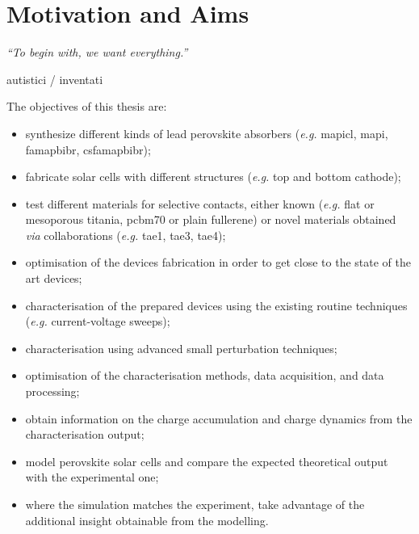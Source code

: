 %
%
%
%

\section{Motivation and Aims}\label{sec:aims}
\epigraph{\textit{\enquote{To begin with, we want everything.}}}{autistici / inventati}


The objectives of this thesis are:\nolinebreak
\begin{itemize}
	\item synthesize different kinds of lead perovskite absorbers (\textsl{e.g.} \gls{mapicl}, \gls{mapi}, \gls{famapbibr}, \gls{csfamapbibr});
	\item fabricate solar cells with different structures (\textsl{e.g.} top and bottom cathode);
	\item test different materials for selective contacts, either known (\textsl{e.g.} flat or mesoporous titania, \gls{pcbm70} or plain fullerene) or novel materials obtained \textsl{via} collaborations (\textsl{e.g.} \gls{tae1}, \gls{tae3}, \gls{tae4});
	\item optimisation of the devices fabrication in order to get close to the state of the art devices;
	\item characterisation of the prepared devices using the existing routine techniques (\textsl{e.g.} current\hyp{}voltage sweeps);
	\item characterisation using advanced small perturbation techniques;
	\item optimisation of the characterisation methods, data acquisition, and data processing;
	\item obtain information on the charge accumulation and charge dynamics from the characterisation output;
	\item model perovskite solar cells and compare the expected theoretical output with the experimental one;
	\item where the simulation matches the experiment, take advantage of the additional insight obtainable from the modelling.	
\end{itemize} 

